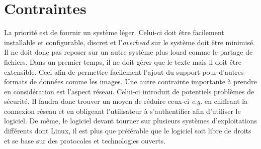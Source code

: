 \section{Contraintes}
La priorité est de fournir un système léger. Celui-ci doit être
facilement installable et configurable, discret et l'\emph{overhead}
sur le système doit être minimisé. Il ne doit donc pas reposer
sur un autre système plus lourd comme le partage de fichiers.
Dans un premier temps, il ne doit gérer que le texte mais il doit être
extensible. Ceci afin de permettre facilement l'ajout du support pour
d'autres formats de données comme les images.
Une autre contrainte importante à prendre en considération
est l'aspect réseau. Celui-ci introduit de potentiels problèmes de sécurité.
Il faudra donc trouver un moyen de réduire ceux-ci \emph{e.g.} en chiffrant
la connexion réseau et en obligeant l'utilisateur à s'authentifier
afin d'utiliser le logiciel. De même, le logiciel devant tourner sur
plusieurs systèmes d'exploitations différents dont Linux, il est
plus que préférable que le logiciel soit libre de droits et se base
sur des protocoles et technologies ouverts.
